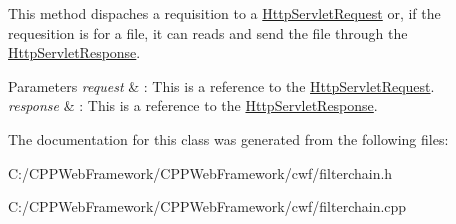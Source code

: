 This method dispaches a requisition to a \mbox{\hyperlink{class_http_servlet_request}{Http\+Servlet\+Request}} or, if the requesition is for a file, it can reads and send the file through the \mbox{\hyperlink{class_http_servlet_response}{Http\+Servlet\+Response}}. 


\begin{DoxyParams}{Parameters}
{\em request} & \+: This is a reference to the \mbox{\hyperlink{class_http_servlet_request}{Http\+Servlet\+Request}}. \\
\hline
{\em response} & \+: This is a reference to the \mbox{\hyperlink{class_http_servlet_response}{Http\+Servlet\+Response}}. \\
\hline
\end{DoxyParams}


The documentation for this class was generated from the following files\+:\begin{DoxyCompactItemize}
\item 
C\+:/\+C\+P\+P\+Web\+Framework/\+C\+P\+P\+Web\+Framework/cwf/filterchain.\+h\item 
C\+:/\+C\+P\+P\+Web\+Framework/\+C\+P\+P\+Web\+Framework/cwf/filterchain.\+cpp\end{DoxyCompactItemize}
